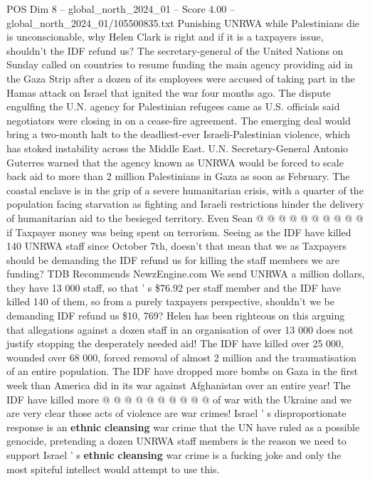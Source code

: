 \begin{textsample}{POS Dim 8 – global\_north\_2024\_01 – Score 4.00 – global\_north\_2024\_01/105500835.txt}  \label{ex:f8_pos_240}
Punishing UNRWA while Palestinians die is unconscionable, why Helen Clark is right and if it is a taxpayers issue, shouldn't the IDF refund us?
The secretary-general of the United Nations on Sunday called on countries to resume funding the main agency providing aid in the Gaza Strip after a dozen of its employees were accused of taking part in the Hamas attack on Israel that ignited the war four months ago.
The dispute engulfing the U.N. agency for Palestinian refugees came as U.S. officials said negotiators were closing in on a cease-fire agreement.
The emerging deal would bring a two-month halt to the deadliest-ever Israeli-Palestinian violence, which has stoked instability across the Middle East.
U.N.
Secretary-General Antonio Guterres warned that the agency known as UNRWA would be forced to scale back aid to more than 2 million Palestinians in Gaza as soon as February.
The coastal enclave is in the grip of a severe humanitarian crisis, with a quarter of the population facing starvation as fighting and Israeli restrictions hinder the delivery of humanitarian aid to the besieged territory.
Even Sean @ @ @ @ @ @ @ @ @ @ if Taxpayer money was being spent on terrorism.
Seeing as the IDF have killed 140 UNRWA staff since October 7th, doesn't that mean that we as Taxpayers should be demanding the IDF refund us for killing the staff members we are funding?
TDB Recommends NewzEngine.com We send UNRWA a million dollars, they have 13 000 staff, so that ' s \$76.92 per staff member and the IDF have killed 140 of them, so from a purely taxpayers perspective, shouldn't we be demanding IDF refund us \$10, 769?
Helen has been righteous on this arguing that allegations against a dozen staff in an organisation of over 13 000 does not justify stopping the desperately needed aid!
The IDF have killed over 25 000, wounded over 68 000, forced removal of almost 2 million and the traumatisation of an entire population.
The IDF have dropped more bombs on Gaza in the first week than America did in its war against Afghanistan over an entire year!
The IDF have killed more @ @ @ @ @ @ @ @ @ @ of war with the Ukraine and we are very clear those acts of violence are war crimes!
Israel ' s disproportionate response is an \textbf{ethnic} \textbf{cleansing} war crime that the UN have ruled as a possible genocide, pretending a dozen UNRWA staff members is the reason we need to support Israel ' s \textbf{ethnic} \textbf{cleansing} war crime is a fucking joke and only the most spiteful intellect would attempt to use this.

\end{textsample}
